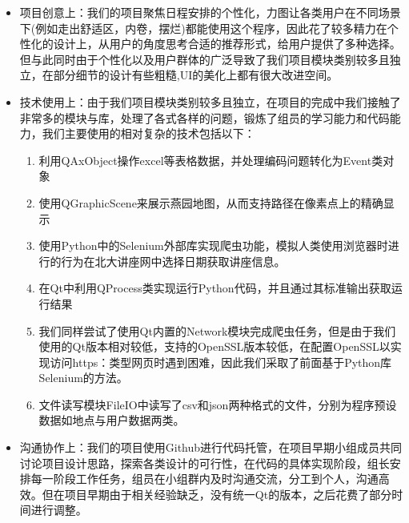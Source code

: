 \documentclass[11pt,hyperref,a4paper,UTF8]{ctexart}
\begin{document}
\begin{CJK}{UTF8}{gkai}
\begin{itemize}
    \item 项目创意上：我们的项目聚焦日程安排的个性化，力图让各类用户在不同场景下(例如走出舒适区，内卷，摆烂)都能使用这个程序，因此花了较多精力在个性化的设计上，从用户的角度思考合适的推荐形式，给用户提供了多种选择。但与此同时由于个性化以及用户群体的广泛导致了我们项目模块类别较多且独立，在部分细节的设计有些粗糙,UI的美化上都有很大改进空间。
    
    \item 技术使用上：由于我们项目模块类别较多且独立，在项目的完成中我们接触了非常多的模块与库，处理了各式各样的问题，锻炼了组员的学习能力和代码能力，我们主要使用的相对复杂的技术包括以下：
    \begin{enumerate}
        \item 利用QAxObject操作excel等表格数据，并处理编码问题转化为Event类对象
        \item 使用QGraphicScene来展示燕园地图，从而支持路径在像素点上的精确显示
        \item 使用Python中的Selenium外部库实现爬虫功能，模拟人类使用浏览器时进行的行为在北大讲座网中选择日期获取讲座信息。
        \item 在Qt中利用QProcess类实现运行Python代码，并且通过其标准输出获取运行结果
        \item 我们同样尝试了使用Qt内置的Network模块完成爬虫任务，但是由于我们使用的Qt版本相对较低，支持的OpenSSL版本较低，在配置OpenSSL以实现访问https：类型网页时遇到困难，因此我们采取了前面基于Python库Selenium的方法。
        \item 文件读写模块FileIO中读写了csv和json两种格式的文件，分别为程序预设数据如地点与用户数据两类。
    \end{enumerate}
    \item 沟通协作上：我们的项目使用Github进行代码托管，在项目早期小组成员共同讨论项目设计思路，探索各类设计的可行性，在代码的具体实现阶段，组长安排每一阶段工作任务，组员在小组群内及时沟通交流，分工到个人，沟通高效。但在项目早期由于相关经验缺乏，没有统一Qt的版本，之后花费了部分时间进行调整。
\end{itemize}


\end{CJK}
\end{document}
